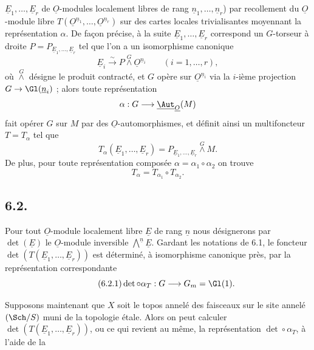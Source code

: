 
\(\underline{E}_1,\ldots,\underline{E}_r\) de \(\underline{O}\)-modules localement libres de rang \(\underline{n}_1,\ldots,\underline{n}_r\)) par recollement du \(\underline{O}\)-module libre \(T(\underline{O}^{\underline{n}_1},\ldots,\underline{O}^{\underline{n}_r})\) sur des cartes locales trivialisantes moyennant la représentation \(\alpha\). De façon précise, à la suite \(\underline{E}_1,\ldots,\underline{E}_r\) correspond un \(G\)-torseur à droite \(P=P_{\underline{E}_1,\ldots,\underline{E}_r}\) tel que l'on a un isomorphisme canonique
\begin{equation}\tag{6.1.3}
 \underline{E}_i\xrightarrow{\sim}P\overset{G}{\wedge}\underline{O}^{\underline{n}_i}\qquad(i=1,\ldots,r),
\end{equation}
où \(\overset{G}{\wedge}\) désigne le produit contracté, et \(G\) opère sur \(\underline{O}^{\underline{n}_i}\) via la \(i\)-ième projection \(G\to\Gl(\underline{n}_i)\) ; alors toute représentation
\[
 \alpha:G\longrightarrow\underline{\Aut}_{\underline{O}}(M)
\]
fait opérer \(G\) sur \(M\) par des \(\underline{O}\)-automorphismes, et définit ainsi un multifoncteur \(T=T_\alpha\) tel que
\begin{equation}\tag{6.1.4}
 T_\alpha(\underline{E}_1,\ldots,\underline{E}_r)=P_{\underline{E}_1,\ldots,\underline{E}_r}\overset{G}{\wedge} M.
\end{equation}
De plus, pour toute représentation composée \(\alpha=\alpha_1\circ\alpha_2\) on trouve
\begin{equation}\tag{6.1.5}
 T_\alpha=T_{\alpha_1}\circ T_{\alpha_2}.
\end{equation}

\subsection*{6.2.}
Pour tout \(\underline{O}\)-module localement libre \(\underline{E}\) de rang \(\underline{n}\) nous désignerons par \(\det(\underline{E})\) le \(\underline{O}\)-module inversible \(\bigwedge\limits^{\underline{n}} \underline{E}\). Gardant les notations de 6.1, le foncteur \(\det(T(\underline{E}_1,\ldots,\underline{E}_r))\) est déterminé, à isomorphisme canonique près, par la représentation correspondante
\begin{equation}\tag{6.2.1}
 \det\circ\alpha_T:G\longrightarrow{G}_m=\Gl(1).
\end{equation}

Supposons maintenant que \(X\) soit le topos annelé des faisceaux sur le site annelé \((\Sch/S)\) muni de la topologie étale. Alors on peut calculer \(\det(T(\underline{E}_1,\ldots,\underline{E}_r))\), ou ce qui revient au même, la représentation \(\det\circ\alpha_T\), à l'aide de la

